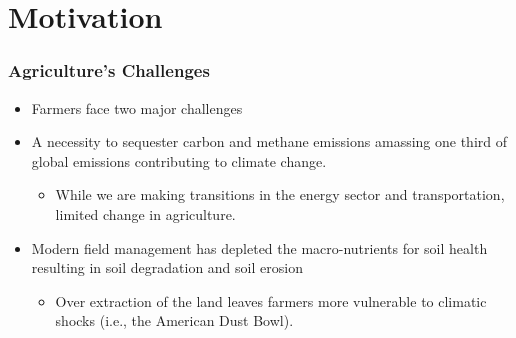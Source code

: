 \documentclass[xcolor = x11names, compress, aspectratio = 169]{beamer}
\renewcommand{\(}{\begin{columns}}
\renewcommand{\)}{\end{columns}}
\newcommand{\<}[1]{\begin{column}{#1}}
\renewcommand{\>}{\end{column}}
\begin{document}
\section{Motivation}
    \begin{frame}
    \frametitle{Agriculture's Challenges}
        \begin{itemize}
            \item Farmers face two major challenges
            \item A necessity to sequester carbon and methane emissions amassing one third of global emissions contributing to climate change. {\scriptsize\citep{Vermeulen2012, Crippa2021}} 
            \begin{itemize}
                \item While we are making transitions in the energy sector and transportation, limited change in agriculture.
            \end{itemize}
            \item Modern field management has depleted the macro-nutrients for soil health resulting in soil degradation and soil erosion {\scriptsize\citep{Lal2015, Louwagie2009, Montgomery2007, Jie2002}} 
            \begin{itemize}
                \item Over extraction of the land leaves farmers more vulnerable to climatic shocks (i.e., the American Dust Bowl).
            \end{itemize}
        \end{itemize}
    \end{frame}
\end{document}
